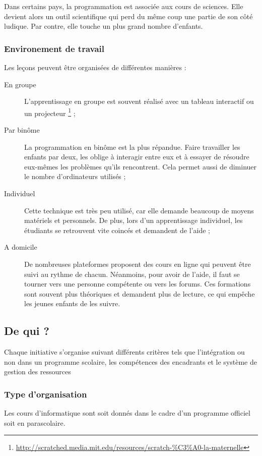 Dans certains pays, la programmation est associée aux cours de sciences. Elle devient alors un outil scientifique qui perd du même coup une partie de son côté ludique. Par contre, elle touche un plus grand nombre d'enfants.\\

\subsubsection{Environement de travail}
\label{paire}
Les leçons peuvent être organisées de différentes manières :
\begin{description}
  \item[En groupe] L'apprentissage en groupe est souvent réalisé avec un tableau interactif ou un projecteur \footnote{\url{http://scratched.media.mit.edu/resources/scratch-\%C3\%A0-la-maternelle}} ;
  \item[Par binôme] La programmation en binôme est la plus répandue. Faire travailler les enfants par deux, les oblige à interagir entre eux et à essayer de résoudre eux-mêmes les problèmes qu'ils rencontrent. Cela permet aussi de diminuer le nombre d'ordinateurs utilisés ;
  \item[Individuel] Cette technique est très peu utilisé, car elle demande beaucoup de moyens matériels et personnels. De plus, lors d'un apprentissage individuel, les étudiants se retrouvent vite coincés et demandent de l'aide ;
  \item[A domicile] De nombreuses plateformes proposent des cours en ligne qui peuvent être suivi au rythme de chacun. Néanmoins, pour avoir de l'aide, il faut se tourner vers une personne compétente ou vers les forums. Ces formations sont souvent plus théoriques et demandent plus de lecture, ce qui empêche les jeunes enfants de les suivre.
\end{description}

\subsection{De qui ?}
Chaque initiative s'organise suivant différents critères tels que l'intégration ou non dans un programme scolaire, les compétences des encadrants et le système de gestion des ressources 

\subsubsection{Type d'organisation} 
Les cours d'informatique sont soit donnés dans le cadre d'un programme officiel soit en parascolaire.

